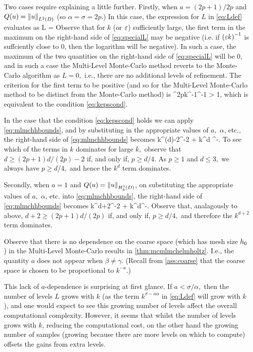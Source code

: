 Two cases require explaining a little further. Firstly, when $a=(2p+1)/2p$ and $Q(u) = \NLtD{u}$ (so $\alpha = \sigma = 2p.$) In this case, the expression for $L$ in \cref{eq:Ldef} evaluates as
  \beq\label{eq:specialL}
  L = \max{}
\eeq
Observe that for $k$ (or $\varepsilon$) sufficiently large, the first term in the maximum on the right-hand side of \cref{eq:specialL} may be negative (i.e. if $\mleft(\eps k\mright)^{-1}$ is suffciently close to 0, then the logarithm will be negative). In such a case, the maximum of the two quantities on the right-hand side of \cref{eq:specialL} will be 0, and in such a case the Multi-Level Monte-Carlo method reverts to the Monte-Carlo algorithm as $L=0,$ i.e., there are no additional levels of refinement. The criterion for the first term to be positive (and so for the Multi-Level Monte-Carlo method to be distinct from the Monte-Carlo method) is
\beqs
{}\co\Ccoarse^{2p}k^{-1}\eps^{-1} > 1,
\eeqs
which is equivalent to the condition \cref{eq:kepscond}.

In the case that the condition \cref{eq:kepscond} holds we can apply \cref{eq:mlmchhbounds}, and by substituting in the appropriate values of $a,$ $\alpha$, etc., the right-hand side of \cref{eq:mlmchhbounds} becomes
\beqs
k^{\mleft(d\mright)-2}\eps^{-2} + k^d \eps^{-}.
\eeqs
To see which of the terms in $k$ dominates for large $k,$ observe that $d \geq (2p+1)d/(2p) -2 $ if, and only if, $p \geq d/4.$ As $p \geq 1$ and $d \leq 3,$ we always have $p \geq d/4,$ and hence the $k^d$ term dominates.

Secondly, when $a=1$ and $Q(u) = \NHokD{u}$, on substituting the appropriate values of $a,$ $\alpha$, etc. into \cref{eq:mlmchhbounds}, the right-hand side of \cref{eq:mlmchhbounds} becomes
\beqs
k^{d+2}\eps^{-2} + k^{d}\eps^{-}.
\eeqs
Observe that, analagously to above, $d + 2 \geq (2p+1)d/(2p)$ if, and only if, $p \geq d/4,$ and therefore the $k^{d+2}$ term dominates.
\epf

Observe that there is no dependence on the coarse space (which has mesh size $h_{0}$) in the Multi-Level Monte-Carlo results in \cref{thm:mcmlmchelmholtz}. I.e., the quantity $a$ does not appear when $\beta \neq \gamma$. (Recall from \cref{ass:coarse} that the coarse space is chosen to be proportional to $k^{-a}$.)

This lack of $a$-dependence is surprising at first glance. If $a < \sigma/\alpha,$ then the number of levels $L$ grows with $k$ (as the term $k^{\sigma - a\alpha}$ in \cref{eq:Ldef} will grow with $k$), and one would expect to see this growing number of levels affect the overall computational complexity. However, it seems that whilst the number of levels grows with $k$, reducing the computational cost, on the other hand the growing number of samples (growing because there are more levels on which to compute) offsets the gains from extra levels.

